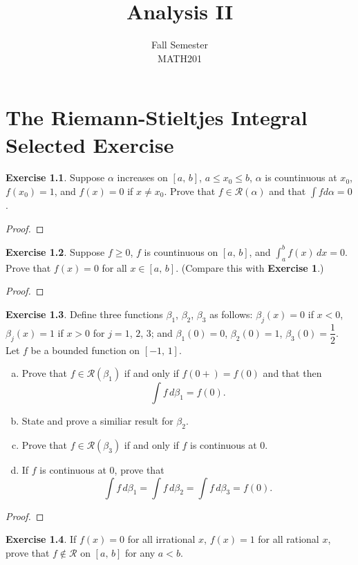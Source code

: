 \documentclass[12pt]{book}
\title{Analysis II}
\author{Fall Semester\\MATH201}
\date{}
\theoremstyle{definition}
\newtheorem{exe}{Exercise}
\begin{document}
	\chapter{The Riemann-Stieltjes Integral\\Selected Exercise}
	\listoftheorems[title = List of Exercise]
	\newpage
	\begin{exe}
		Suppose $\alpha$ increases on $[a,\,b]$, $a\leq x_0 \leq b$, $\alpha$ is countinuous at $x_0$, $f(x_0)=1$, and $f(x)=0$ if $x\neq x_0$. Prove that $f\in\mathscr{R}(\alpha)$ and that $\int f d\alpha=0$.
	\end{exe}
	\begin{proof}
	\end{proof}
	\newpage
	\begin{exe}
		Suppose $f\geq 0$, $f$ is countinuous on $[a,\,b]$, and $\displaystyle\int_{a}^{b} f(x)\,dx=0$. Prove that $f(x)=0$ for all $x\in[a,\,b]$. (Compare this with \textbf{Exercise 1}.)
	\end{exe}
	\begin{proof}	
	\end{proof}
	\newpage
	\begin{exe}
		Define three functions $\beta_1$, $\beta_2$, $\beta_3$ as follows: $\beta_j(x)=0$ if $x<0$, $\beta_j(x)=1$ if $x>0$ for $j=1$, $2$, $3$; and $\beta_1(0)=0$, $\beta_2(0)=1$, $\beta_3(0)=\dfrac{1}{2}$. Let $f$ be a bounded function on $[-1,\,1]$.
		\begin{enumerate}[(a)]
			\item Prove that $f\in\mathscr{R}(\beta_1)$ if and only if $f(0+)=f(0)$ and that then \begin{equation*}
				\int f\,d\beta_1=f(0).
			\end{equation*}
			\item State and prove a similiar result for $\beta_2$.
			\item Prove that $f\in\mathscr{R}(\beta_3)$ if and only if $f$ is continuous at $0$.
			\item If $f$ is continuous at $0$, prove that \begin{equation*}
				\int f\,d\beta_1=\int f\,d\beta_2=\int f\,d\beta_3=f(0).
			\end{equation*}
		\end{enumerate}
	\end{exe}
	\begin{proof}
	\end{proof}
	\newpage
	\begin{exe}
		If $f(x)=0$ for all irrational $x$, $f(x)=1$ for all rational $x$, prove that $f\notin \mathscr{R}$ on $[a,\,b]$ for any $a<b$.
	\end{exe}
\end{document}

